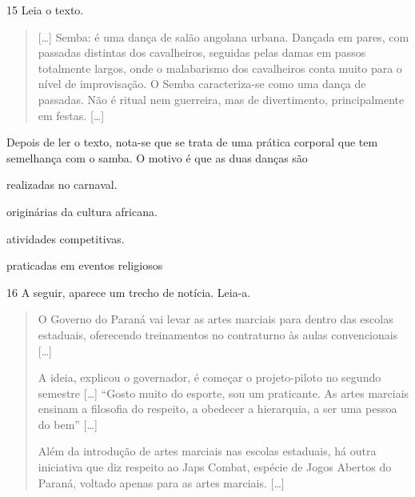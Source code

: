 \num{15} Leia o texto.
\begin{quote}
  {[}\ldots{}{]} Semba: é uma dança de salão angolana urbana. Dançada em pares, com
  passadas distintas dos cavalheiros, seguidas pelas damas em passos
  totalmente largos, onde o malabarismo dos cavalheiros conta muito para
  o nível de improvisação. O Semba caracteriza-se como uma dança de
  passadas. Não é ritual nem guerreira, mas de divertimento,
  principalmente em festas. {[}\ldots{}{]}

\end{quote}

\noindent{}Depois de ler o texto, nota-se que se trata de uma prática corporal que tem semelhança
com o samba. O motivo é que as duas danças são

\begin{escolha}
\item realizadas no carnaval.

\item originárias da cultura africana.

\item atividades competitivas.

\item praticadas em eventos religiosos
\end{escolha}



\num{16} A seguir, aparece um trecho de notícia. Leia-a.
\begin{quote}
  O Governo do Paraná vai levar as artes marciais para dentro das
  escolas estaduais, oferecendo treinamentos no contraturno às aulas
  convencionais {[}\ldots{}{]}

A ideia, explicou o governador, é começar o projeto-piloto no segundo semestre {[}\ldots{}{]} “Gosto muito do esporte, sou
um praticante. As artes marciais ensinam a filosofia do respeito, a
obedecer a hierarquia, a ser uma pessoa do bem” {[}\ldots{}{]}

Além da introdução de artes marciais nas escolas estaduais, há outra
iniciativa que diz respeito ao Japs Combat, espécie de Jogos Abertos do
Paraná, voltado apenas para as artes marciais. {[}\ldots{}{]}

\end{quote}

